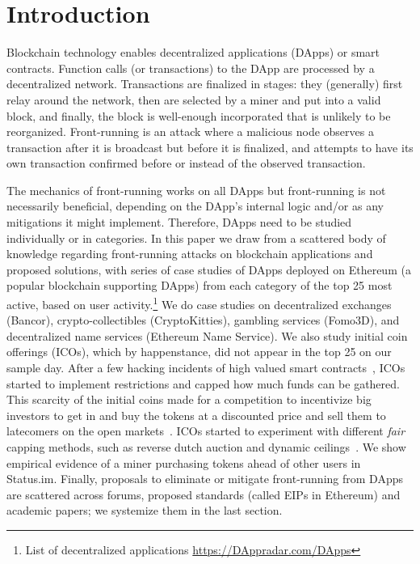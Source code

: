 
\section{Introduction} \label{sec:intro}

Blockchain technology enables decentralized applications (DApps) or smart contracts. Function calls (or transactions) to the DApp are processed by a decentralized network. Transactions are finalized in stages: they (generally) first relay around the network, then are selected by a miner and put into a valid block, and finally, the block is well-enough incorporated that is unlikely to be reorganized. Front-running is an attack where a malicious node observes a transaction after it is broadcast but before it is finalized, and attempts to have its own transaction confirmed before or instead of the observed transaction.

The mechanics of front-running works on all DApps but front-running is not necessarily beneficial, depending on the DApp's internal logic and/or as any mitigations it might implement. Therefore, DApps need to be studied individually or in categories. In this paper we draw from a scattered body of knowledge regarding front-running attacks on blockchain applications and proposed solutions, with series of case studies of DApps deployed on Ethereum (a popular blockchain supporting DApps) from each category of the top 25 most active, based on user activity.\footnote{List of decentralized applications \url{https://DAppradar.com/DApps}} We do case studies on decentralized exchanges (\eg Bancor), crypto-collectibles (\eg CryptoKitties), gambling services (\eg Fomo3D), and decentralized name services (\eg Ethereum Name Service). We also study initial coin offerings (ICOs), which by happenstance, did not appear in the top 25 on our sample day. After a few hacking incidents of high valued smart contracts~\cite{siegel2016daohack}, ICOs started to implement restrictions and capped how much funds can be gathered. This scarcity of the initial coins made for a competition to incentivize big investors to get in and buy the tokens at a discounted price and sell them to latecomers on the open markets~\cite{zetzsche2018ico,li2018initial}. ICOs started to experiment with different \textit{fair} capping methods, such as reverse dutch auction and dynamic ceilings~\cite{kaal2017initial}. We show empirical evidence of a miner purchasing tokens ahead of other users in Status.im. Finally, proposals to eliminate or mitigate front-running from DApps are scattered across forums, proposed standards (called EIPs in Ethereum) and academic papers; we systemize them in the last section.

